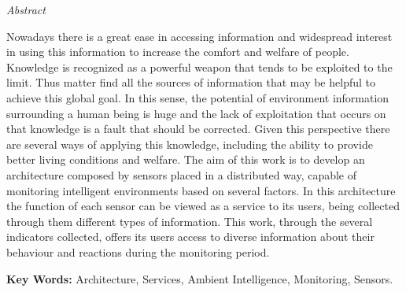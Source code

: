 \begin{center}
{\large \textit{Abstract} }
\end{center}







\vspace{0.5cm}
\quad Nowadays there is a great ease in accessing information and widespread interest in using  this information to increase the comfort and welfare of people. Knowledge is recognized as a powerful weapon that tends to be exploited to the limit. Thus matter find all the sources of information that may be helpful to achieve this global goal. In this sense, the potential of environment information surrounding a human being is huge and the lack of exploitation that occurs on that knowledge is a fault that should be corrected. Given this perspective there are several ways of applying this knowledge, including the ability to provide better living conditions and welfare. The aim of this work is to develop an architecture composed by sensors placed in a distributed way, capable of monitoring intelligent environments based on several factors. In this architecture the function of each sensor can be viewed as a service to its users, being collected through them different types of information. This work, through the several indicators collected, offers its users access to diverse information about their behaviour and reactions during  the monitoring period.
\vspace{3cm}

\textbf{Key Words:} Architecture, Services, Ambient Intelligence, Monitoring, Sensors.